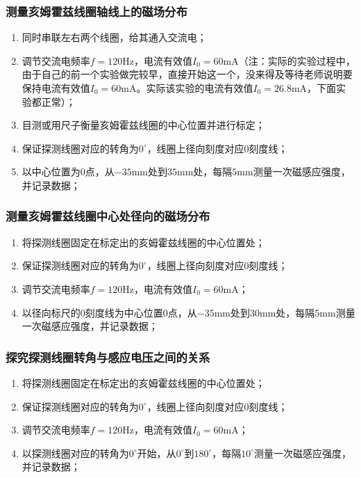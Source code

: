 \documentclass[zihao=5, UTF8]{article}
\theoremstyle{MyLineTheoremStyle} %
\theoremstyle{MyBlockTheoremStyle} %
\theoremstyle{MySubsubsectionStyle} %
\begin{document}
\subsubsection{测量亥姆霍兹线圈轴线上的磁场分布}
\begin{enumerate}
    \item 同时串联左右两个线圈，给其通入交流电；
    \item 调节交流电频率$f=120\text{Hz}$，电流有效值$I_0=60\text{mA}$（注：实际的实验过程中，由于自己的前一个实验做完较早，直接开始这一个，没来得及等待老师说明要保持电流有效值$I_0=60\text{mA}$。实际该实验的电流有效值$I_0=26.8\text{mA}$，下面实验都正常）；
    \item 目测或用尺子衡量亥姆霍兹线圈的中心位置并进行标定；
    \item 保证探测线圈对应的转角为$0^\circ$，线圈上径向刻度对应0刻度线；
    \item 以中心位置为0点，从$-35\text{mm}$处到$35\text{mm}$处，每隔$5\text{mm}$测量一次磁感应强度，并记录数据；
\end{enumerate}

\subsubsection{测量亥姆霍兹线圈中心处径向的磁场分布}
\begin{enumerate}
    \item 将探测线圈固定在标定出的亥姆霍兹线圈的中心位置处；
    \item 保证探测线圈对应的转角为$0^\circ$，线圈上径向刻度对应0刻度线；
    \item 调节交流电频率$f=120\text{Hz}$，电流有效值$I_0=60\text{mA}$；
    \item 以径向标尺的0刻度线为中心位置0点，从$-35\text{mm}$处到$30\text{mm}$处，每隔$5\text{mm}$测量一次磁感应强度，并记录数据；
\end{enumerate}

\subsubsection{探究探测线圈转角与感应电压之间的关系}
\begin{enumerate}
    \item 将探测线圈固定在标定出的亥姆霍兹线圈的中心位置处；
    \item 保证探测线圈对应的转角为$0^\circ$，线圈上径向刻度对应0刻度线；
    \item 调节交流电频率$f=120\text{Hz}$，电流有效值$I_0=60\text{mA}$；
    \item 以探测线圈对应的转角为$0^\circ$开始，从$0^\circ$到$180^\circ$，每隔$10^\circ$测量一次磁感应强度，并记录数据；
\end{enumerate}
\end{document}
